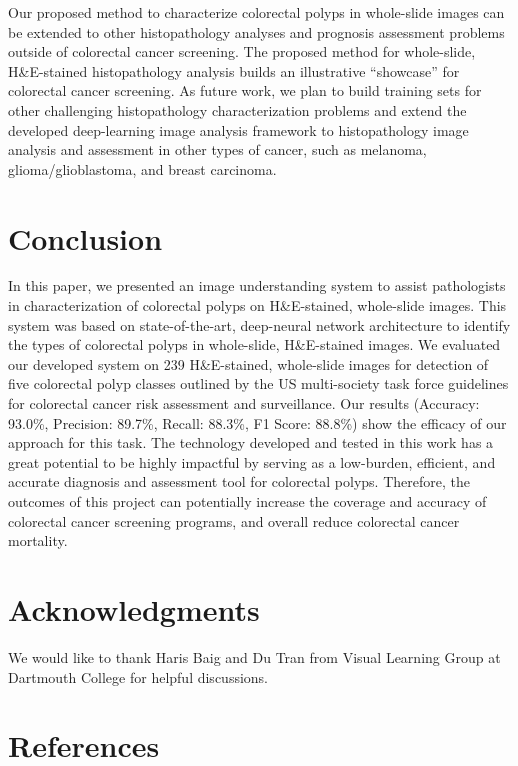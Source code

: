 \documentclass[review]{elsarticle}
\begin{document}
Our proposed method to characterize colorectal polyps in whole-slide images can be extended to other histopathology analyses and prognosis assessment problems outside of colorectal cancer screening. The proposed method for whole-slide, H\&E-stained histopathology analysis builds an illustrative “showcase” for colorectal cancer screening. As future work, we plan to build training sets for other challenging histopathology characterization problems and extend the developed deep-learning image analysis framework to histopathology image analysis and assessment in other types of cancer, such as melanoma, glioma/glioblastoma, and breast carcinoma.



\section{Conclusion}\label{conclusion}
In this paper, we presented an image understanding system to assist pathologists in characterization of colorectal polyps on H\&E-stained, whole-slide images. This system was based on state-of-the-art, deep-neural network architecture to identify the types of colorectal polyps in whole-slide, H\&E-stained images. We evaluated our developed system on 239 H\&E-stained, whole-slide images for detection of five colorectal polyp classes outlined by the US multi-society task force guidelines for colorectal cancer risk assessment and surveillance. Our results (Accuracy: 93.0\%, Precision: 89.7\%, Recall: 88.3\%, F1 Score: 88.8\%) show the efficacy of our approach for this task. The technology developed and tested in this work has a great potential to be highly impactful by serving as a low-burden, efficient, and accurate diagnosis and assessment tool for colorectal polyps. Therefore, the outcomes of this project can potentially increase the coverage and accuracy of colorectal cancer screening programs, and overall reduce colorectal cancer mortality.


\section{Acknowledgments}
We would like to thank Haris Baig and Du Tran from Visual Learning Group at Dartmouth College for helpful discussions. 


\section*{References}

\end{document}
